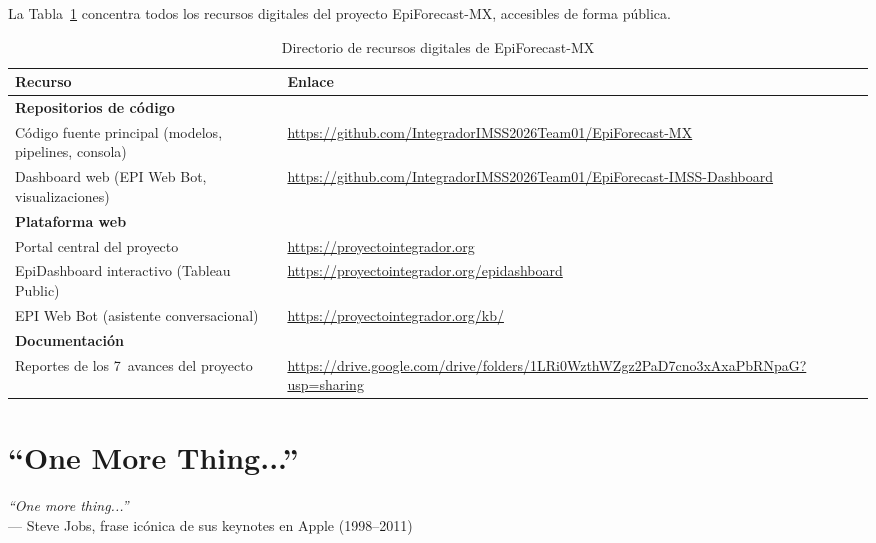 \documentclass[12pt, letterpaper]{article}
\newcommand{\tabref}[1]{Tabla~\ref{#1}}
\begin{document}
La \tabref{tab:enlaces} concentra todos los recursos digitales del proyecto EpiForecast-MX, accesibles de forma pública.

\begin{table}[H]
\centering
\caption{Directorio de recursos digitales de EpiForecast-MX}
\label{tab:enlaces}
\small
\renewcommand{\arraystretch}{1.4}
\begin{tabularx}{\textwidth}{l >{\raggedright\arraybackslash}X}
\toprule
\textbf{Recurso} & \textbf{Enlace} \\
\midrule
\multicolumn{2}{l}{\textbf{\color{teal} Repositorios de código}} \\
\addlinespace
Código fuente principal (modelos, pipelines, consola) & \url{https://github.com/IntegradorIMSS2026Team01/EpiForecast-MX} \\
\addlinespace
Dashboard web (EPI Web Bot, visualizaciones) & \url{https://github.com/IntegradorIMSS2026Team01/EpiForecast-IMSS-Dashboard} \\
\midrule
\multicolumn{2}{l}{\textbf{\color{teal} Plataforma web}} \\
\addlinespace
Portal central del proyecto & \url{https://proyectointegrador.org} \\
\addlinespace
EpiDashboard interactivo (Tableau Public) & \url{https://proyectointegrador.org/epidashboard} \\
\addlinespace
EPI Web Bot (asistente conversacional) & \url{https://proyectointegrador.org/kb/} \\
\midrule
\multicolumn{2}{l}{\textbf{\color{teal} Documentación}} \\
\addlinespace
Reportes de los 7~avances del proyecto & \url{https://drive.google.com/drive/folders/1LRi0WzthWZgz2PaD7cno3xAxaPbRNpaG?usp=sharing} \\
\bottomrule
\end{tabularx}
\end{table}

\newpage
\section{``One More Thing...''}\label{sec:one-more-thing}

\begin{flushright}
\textit{``One more thing...''}\\[0.15cm]
\textcolor{coolgray}{\small --- Steve Jobs, frase icónica de sus keynotes en Apple (1998--2011)}
\end{flushright}
\end{document}
